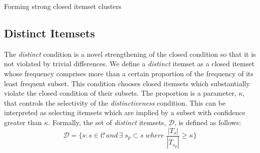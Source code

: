 \documentclass{sig-alternate}
\begin{document}
\begin{algorithm}
\SetAlgoLined
\LinesNumbered
{} 
\;
\caption{Forming strong closed itemset clusters}
\label{algo:alliance}
\end{algorithm}

\subsection{Distinct Itemsets}


The \emph{distinct} condition is a novel strengthening of the closed condition
so that it is not violated by trivial differences.
We define a \emph{distinct} itemset as a closed itemset whose frequency
comprises more than a certain proportion of the frequency of its least
frequent subset. 
This condition chooses closed itemsets which substantially violate the closed
condition of their subsets.
The proportion is a parameter, $\kappa$, that controls the selectivity of the
\emph{distinctiveness} condition.
This can be interpreted as selecting itemsets which are implied by a subset
with confidence greater than $\kappa$.
Formally, the set of \emph{distinct} itemsets, $\mathcal{D}$,
is defined as follows:
\begin{equation}\mathcal{D} = \{s: s \in \mathcal{C} \, and \, \exists \; s_{p} \subset s \; where \; \frac{|T_{s}|}{|T_{s_{p}}|} \ge \kappa 
\}\end{equation}
\end{document}
